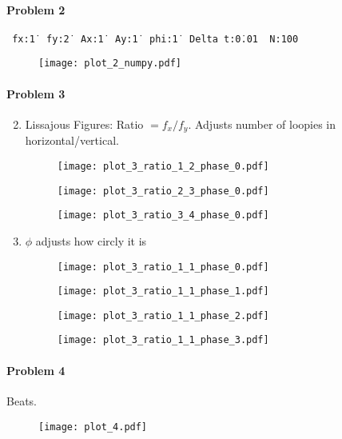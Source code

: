 \documentclass[12pt, oneside, letterpaper, fleqn]{article}
\begin{document}
\paragraph{Problem 2}
\texttt{
fx:\. 1\,
fy:\. 2\,
Ax:\. 1\,
Ay:\. 1\,
phi:\. 1\,
Delta t:\. 0.01\,
N:\. 100\,}
\begin{figure}[htbp]
\texttt{[image: plot\_2\_numpy.pdf]}
\end{figure}

\paragraph{Problem 3}
\begin{enumerate}
\setcounter{enumi}{1}
\item Lissajous Figures: Ratio $= f_x/f_y$. Adjusts number of loopies in
horizontal/vertical.
\begin{figure}[htbp]
\texttt{[image: plot\_3\_ratio\_1\_2\_phase\_0.pdf]}
\end{figure}
\begin{figure}[htbp]
\texttt{[image: plot\_3\_ratio\_2\_3\_phase\_0.pdf]}
\end{figure}
\begin{figure}[htbp]
\texttt{[image: plot\_3\_ratio\_3\_4\_phase\_0.pdf]}
\end{figure}

\pagebreak
\item $\phi$ adjusts how circly it is
\begin{figure}[htbp]
\texttt{[image: plot\_3\_ratio\_1\_1\_phase\_0.pdf]}
\end{figure}
\begin{figure}[htbp]
\texttt{[image: plot\_3\_ratio\_1\_1\_phase\_1.pdf]}
\end{figure}
\begin{figure}[htbp]
\texttt{[image: plot\_3\_ratio\_1\_1\_phase\_2.pdf]}
\end{figure}
\begin{figure}[htbp]
\texttt{[image: plot\_3\_ratio\_1\_1\_phase\_3.pdf]}
\end{figure}
\end{enumerate}

\pagebreak
\paragraph{Problem 4}
Beats.
\begin{figure}[htbp]
\texttt{[image: plot\_4.pdf]}
\end{figure}
\end{document}

